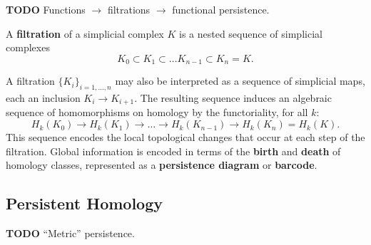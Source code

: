 \textbf{TODO} Functions $\to$ filtrations $\to$ functional persistence.

\begin{definition}
    A \textbf{filtration} of a simplicial complex $K$ is a nested sequence of simplicial complexes \[K_0 \subset K_1\subset\ldots K_{n-1}\subset K_n = K.\]
\end{definition}

A filtration $\{K_i\}_{i=1,\ldots,n}$ may also be interpreted as a sequence of simplicial maps, each an inclusion $K_i\to K_{i+1}$.
The resulting sequence induces an algebraic sequence of homomorphisms on homology by the functoriality, for all $k$:
\[ H_k(K_0)\to H_k(K_1)\to\ldots\to H_k(K_{n-1})\to H_k(K_n) = H_k(K). \]
This sequence encodes the local topological changes that occur at each step of the filtration.
Global information is encoded in terms of the \textbf{birth} and \textbf{death} of homology classes, represented as a \textbf{persistence diagram} or \textbf{barcode}.

\subsection{Persistent Homology}

\vspace{0.25in}
\textbf{TODO} ``Metric'' persistence.
\vspace{0.25in}

